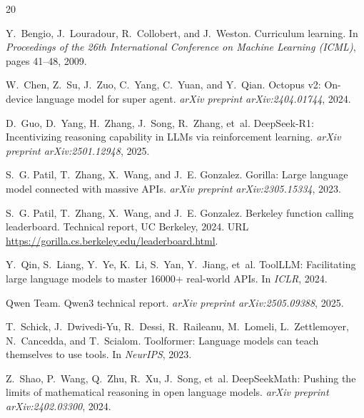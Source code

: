 \documentclass[10pt,twocolumn]{article}
\begin{document}

\begin{thebibliography}{20}

Y.~Bengio, J.~Louradour, R.~Collobert, and J.~Weston.
\newblock Curriculum learning.
\newblock In \emph{Proceedings of the 26th International Conference on Machine Learning (ICML)}, pages 41--48, 2009.

W.~Chen, Z.~Su, J.~Zuo, C.~Yang, C.~Yuan, and Y.~Qian.
\newblock Octopus v2: On-device language model for super agent.
\newblock \emph{arXiv preprint arXiv:2404.01744}, 2024.

D.~Guo, D.~Yang, H.~Zhang, J.~Song, R.~Zhang, et~al.
\newblock DeepSeek-R1: Incentivizing reasoning capability in LLMs via reinforcement learning.
\newblock \emph{arXiv preprint arXiv:2501.12948}, 2025.

S.~G. Patil, T.~Zhang, X.~Wang, and J.~E. Gonzalez.
\newblock Gorilla: Large language model connected with massive APIs.
\newblock \emph{arXiv preprint arXiv:2305.15334}, 2023.

S.~G. Patil, T.~Zhang, X.~Wang, and J.~E. Gonzalez.
\newblock Berkeley function calling leaderboard.
\newblock Technical report, UC Berkeley, 2024.
\newblock URL \url{https://gorilla.cs.berkeley.edu/leaderboard.html}.

Y.~Qin, S.~Liang, Y.~Ye, K.~Li, S.~Yan, Y.~Jiang, et~al.
\newblock ToolLLM: Facilitating large language models to master 16000+ real-world APIs.
\newblock In \emph{ICLR}, 2024.

Qwen Team.
\newblock Qwen3 technical report.
\newblock \emph{arXiv preprint arXiv:2505.09388}, 2025.

T.~Schick, J.~Dwivedi-Yu, R.~Dessi, R.~Raileanu, M.~Lomeli, L.~Zettlemoyer, N.~Cancedda, and T.~Scialom.
\newblock Toolformer: Language models can teach themselves to use tools.
\newblock In \emph{NeurIPS}, 2023.

Z.~Shao, P.~Wang, Q.~Zhu, R.~Xu, J.~Song, et~al.
\newblock DeepSeekMath: Pushing the limits of mathematical reasoning in open language models.
\newblock \emph{arXiv preprint arXiv:2402.03300}, 2024.


\end{thebibliography}
\end{document}
